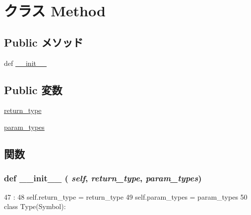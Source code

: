 \hypertarget{classslicc_1_1symbols_1_1Type_1_1Method}{
\section{クラス Method}
\label{classslicc_1_1symbols_1_1Type_1_1Method}
}
\subsection*{Public メソッド}
\begin{DoxyCompactItemize}
\item 
def \hyperlink{classslicc_1_1symbols_1_1Type_1_1Method_ac775ee34451fdfa742b318538164070e}{\_\-\_\-init\_\-\_\-}
\end{DoxyCompactItemize}
\subsection*{Public 変数}
\begin{DoxyCompactItemize}
\item 
\hyperlink{classslicc_1_1symbols_1_1Type_1_1Method_a8158a2d869c53eb8f38c869b380a1209}{return\_\-type}
\item 
\hyperlink{classslicc_1_1symbols_1_1Type_1_1Method_adee0355d5a54fc002b5fd1103cca688c}{param\_\-types}
\end{DoxyCompactItemize}


\subsection{関数}
\hypertarget{classslicc_1_1symbols_1_1Type_1_1Method_ac775ee34451fdfa742b318538164070e}{
\subsubsection[{\_\-\_\-init\_\-\_\-}]{\setlength{\rightskip}{0pt plus 5cm}def \_\-\_\-init\_\-\_\- ( {\em self}, \/   {\em return\_\-type}, \/   {\em param\_\-types})}}
\label{classslicc_1_1symbols_1_1Type_1_1Method_ac775ee34451fdfa742b318538164070e}



\begin{DoxyCode}
47                                                 :
48         self.return_type = return_type
49         self.param_types = param_types
50 
class Type(Symbol):
\end{DoxyCode}


